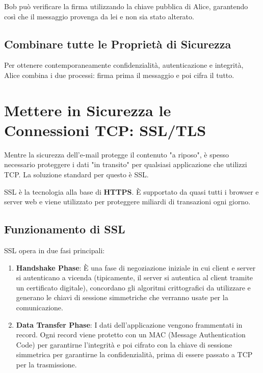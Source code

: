 Bob può verificare la firma utilizzando la chiave pubblica di Alice, garantendo così che il messaggio provenga da lei e non sia stato alterato.

\subsection{Combinare tutte le Proprietà di Sicurezza}
Per ottenere contemporaneamente confidenzialità, autenticazione e integrità, Alice combina i due processi: firma prima il messaggio e poi cifra il tutto.


\section{Mettere in Sicurezza le Connessioni TCP: SSL/TLS}
Mentre la sicurezza dell'e-mail protegge il contenuto "a riposo", è spesso necessario proteggere i dati "in transito" per qualsiasi applicazione che utilizzi TCP. La soluzione standard per questo è SSL.


SSL è la tecnologia alla base di \textbf{HTTPS}. È supportato da quasi tutti i browser e server web e viene utilizzato per proteggere miliardi di transazioni ogni giorno.

\subsection{Funzionamento di SSL}
SSL opera in due fasi principali:
\begin{enumerate}
    \item \textbf{Handshake Phase}: È una fase di negoziazione iniziale in cui client e server si autenticano a vicenda (tipicamente, il server si autentica al client tramite un certificato digitale), concordano gli algoritmi crittografici da utilizzare e generano le chiavi di sessione simmetriche che verranno usate per la comunicazione.
    \item \textbf{Data Transfer Phase}: I dati dell'applicazione vengono frammentati in record. Ogni record viene protetto con un MAC (Message Authentication Code) per garantirne l'integrità e poi cifrato con la chiave di sessione simmetrica per garantirne la confidenzialità, prima di essere passato a TCP per la trasmissione.
\end{enumerate}

